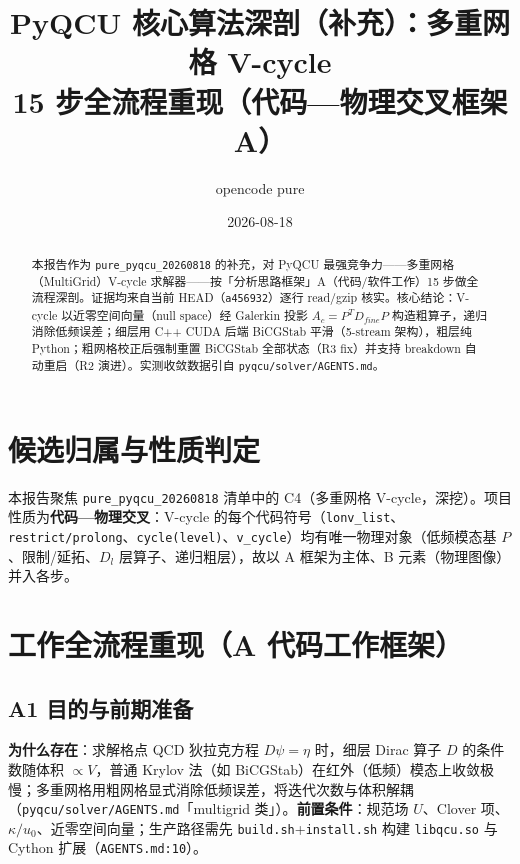 \documentclass[UTF8]{ctexart}
\title{PyQCU 核心算法深剖（补充）：多重网格 V-cycle\\[6pt]\large 15 步全流程重现（代码—物理交叉框架 A）}
\author{opencode pure}
\date{2026-08-18}
\begin{document}
\maketitle

\begin{abstract}
本报告作为 \texttt{pure\_pyqcu\_20260818} 的补充，对 PyQCU 最强竞争力——多重网格（MultiGrid）V-cycle 求解器——按「分析思路框架」A（代码/软件工作）15 步做全流程深剖。证据均来自当前 HEAD（\texttt{a456932}）逐行 read/gzip 核实。核心结论：V-cycle 以近零空间向量（null space）经 Galerkin 投影 $A_c=P^T D_{fine} P$ 构造粗算子，递归消除低频误差；细层用 C++ CUDA 后端 BiCGStab 平滑（5-stream 架构），粗层纯 Python；粗网格校正后强制重置 BiCGStab 全部状态（R3 fix）并支持 breakdown 自动重启（R2 演进）。实测收敛数据引自 \texttt{pyqcu/solver/AGENTS.md}。
\end{abstract}

\tableofcontents

\section{候选归属与性质判定}
本报告聚焦 \texttt{pure\_pyqcu\_20260818} 清单中的 C4（多重网格 V-cycle，深挖）。项目性质为\textbf{代码—物理交叉}：V-cycle 的每个代码符号（\texttt{lonv\_list}、\texttt{restrict/prolong}、\texttt{cycle(level)}、\texttt{v\_cycle}）均有唯一物理对象（低频模态基 $P$、限制/延拓、$D_l$ 层算子、递归粗层），故以 A 框架为主体、B 元素（物理图像）并入各步。

\section{工作全流程重现（A 代码工作框架）}

\subsection{A1 目的与前期准备}
\textbf{为什么存在}：求解格点 QCD 狄拉克方程 $D\psi=\eta$ 时，细层 Dirac 算子 $D$ 的条件数随体积 $\propto V$，普通 Krylov 法（如 BiCGStab）在红外（低频）模态上收敛极慢；多重网格用粗网格显式消除低频误差，将迭代次数与体积解耦（\texttt{pyqcu/solver/AGENTS.md}「multigrid 类」）。\textbf{前置条件}：规范场 $U$、Clover 项、$\kappa/u_0$、近零空间向量；生产路径需先 \texttt{build.sh}+\texttt{install.sh} 构建 \texttt{libqcu.so} 与 Cython 扩展（\texttt{AGENTS.md:10}）。
\end{document}
